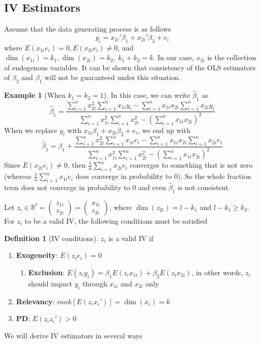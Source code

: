 \documentclass[12pt]{article}
\theoremstyle{definition}
\newtheorem{definition}{Definition}[section]
\theoremstyle{property}
\theoremstyle{assumption}
\theoremstyle{example}
\newtheorem{example}{Example}[section]
\theoremstyle{comment}
\begin{document}
\subsection{IV Estimators}
Assume that the data generating process is as follows
\[
y_i = x_{1i}'\beta_1+x_{2i}'\beta_2+e_i
\]
where $E(x_{1i}e_i)=0, E(x_{2i}e_i)\neq0$, and $\dim(x_{1i})=k_1, \dim(x_{2i})=k_2,\ k_1+k_2=k$. In our case, $x_{2i}$ is the collection of endogenous variables. It can be shown that consistency of the OLS estimators of $\beta_2$ and $\beta_1$ will not be guaranteed under this situation.
\begin{mdframed}[backgroundcolor=yellow!5] 
\begin{example}[When $k_1=k_2=1$]
In this case, we can write $\hat{\beta}_1$ as
\[
\hat{\beta}_1=\frac{\sum_{i=1}^n x_{2i}^2\sum_{i=1}^n x_{1i}y_i-\sum_{i=1}^n x_{1i}x_{2i}\sum_{i=1}^nx_{2i}y_i}{\sum_{i=1}^n x_{1i}^2\sum_{i=1}^nx_{2i}^2-(\sum_{i=1}^nx_{1i}x_{2i})^2}
\]
When we replace $y_i$ with $x_{1i}\beta_1+x_{2i}\beta_2+e_i$, we end up with
\[
\hat{\beta}_1=\beta_1+\frac{\sum_{i=1}^n x_{2i}^2\sum_{i=1}^n x_{1i}e_i-\sum_{i=1}^n x_{1i}x_{2i}\sum_{i=1}^nx_{2i}e_i}{\sum_{i=1}^n x_{1i}^2\sum_{i=1}^nx_{2i}^2-(\sum_{i=1}^nx_{1i}x_{2i})^2}
\]
Since $E(x_{2i}e_i)\neq0$, then $\frac{1}{n}\sum_{i=1}^nx_{2i}e_i$ converges to something that is not zero (whereas $\frac{1}{n}\sum_{i=1}^nx_{1i}e_i$ does converge in probability to 0). So the whole fraction term does not converge in probability to 0 and even $\hat{\beta}_1$ is not consistent. 
\end{example}
\end{mdframed}
\par
Let $z_i\in\mathbb{R}^l = \begin{pmatrix}z_{1i} \\ z_{2i}\end{pmatrix}=\begin{pmatrix}x_{1i} \\ z_{2i}\end{pmatrix}$, where $\dim(z_{2i})=l-k_1$ and $l-k_1\geq k_2$. For $z_i$ to be a valid IV, the following conditions must be satisfied
\begin{mdframed}[backgroundcolor=blue!5] 
\begin{definition}[IV conditions]
$z_i$ is a valid IV if
\begin{enumerate}
\item \textbf{Exogeneity}: $E(z_ie_i)=0$
\begin{enumerate}
\item \textbf{Exclusion}: $E(z_iy_i)=\beta_1E(z_ix_{1i})+\beta_2E(z_ix_{2i})$, in other words, $z_i$ should impact $y_i$ through $x_{1i}$ and $x_{2i}$ only
\end{enumerate}
\item \textbf{Relevancy}: $rank[E(z_ix_i')]=\dim(x_i)=k$
\item \textbf{PD}: $E(z_iz_i')>0$
\end{enumerate}
\end{definition}
\end{mdframed}
We will derive IV estimators in several ways
\end{document}
